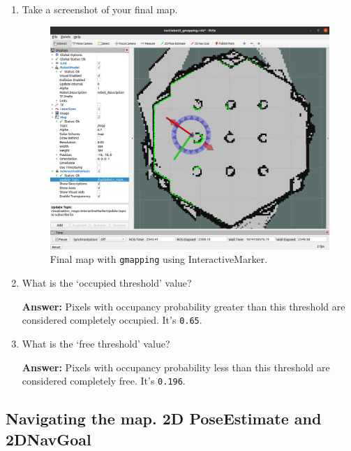 \documentclass[12pt]{article}
\begin{document}
\begin{enumerate}
\begin{enumerate}
        \item Take a screenshot of your final map.
        
        \begin{figure}[H]
          \centering\includegraphics[width=14cm]{images/final_gmapping.png}\vspace{-10pt}
          \caption{Final map with \texttt{gmapping} using InteractiveMarker.}\label{fig:final_gmapping}
          \end{figure}

        \item What is the ‘occupied threshold’ value?
        
        \textbf{Answer: }Pixels with occupancy probability greater than this threshold are considered completely occupied. It's \texttt{0.65}.

        \item What is the ‘free threshold’ value?
        
        \textbf{Answer: }Pixels with occupancy probability less than this threshold are considered completely free. It's \texttt{0.196}.
        
    \end{enumerate}
    
\end{enumerate}


\subsection{Navigating the map. 2D PoseEstimate and 2DNavGoal}
\end{document}

